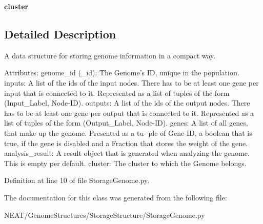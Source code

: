 \begin{DoxyCompactItemize}
\item 
{\bfseries cluster}\hypertarget{class_n_e_a_t___py_genetics_1_1_n_e_a_t_1_1_genome_structures_1_1_storage_structure_1_1_storage_genome_1_1_storage_genome_a4d31fdd32df12f7c1d9c6848b4ae1bcc}{}\label{class_n_e_a_t___py_genetics_1_1_n_e_a_t_1_1_genome_structures_1_1_storage_structure_1_1_storage_genome_1_1_storage_genome_a4d31fdd32df12f7c1d9c6848b4ae1bcc}

\end{DoxyCompactItemize}


\subsection{Detailed Description}
\begin{DoxyVerb}A data structure for storing genome information in a
compact way.

Attributes:
    genome_id (_id):
        The Genome's ID, unique in the population.
    inputs:
        A list of the ids of the input nodes. There has to be at least
        one gene per input that is connected to it. Represented as a list
        of tuples of the form (Input_Label, Node-ID).
    outputs:
        A list of the ids of the output nodes. There has to be at least
        one gene per output that is connected to it. Represented as a list
        of tuples of the form (Output_Label, Node-ID).
    genes:
        A list of all genes, that make up the genome. Presented as a tu-
        ple of Gene-ID, a boolean that is true, if the gene is disabled
        and a Fraction that stores the weight of the gene.
    analysis_result:
        A result object that is generated when analyzing the genome.
        This is empty per default.
    cluster:
        The cluster to which the Genome belongs.
\end{DoxyVerb}
 

Definition at line 10 of file Storage\+Genome.\+py.



The documentation for this class was generated from the following file\+:\begin{DoxyCompactItemize}
\item 
N\+E\+A\+T/\+Genome\+Structures/\+Storage\+Structure/Storage\+Genome.\+py\end{DoxyCompactItemize}
